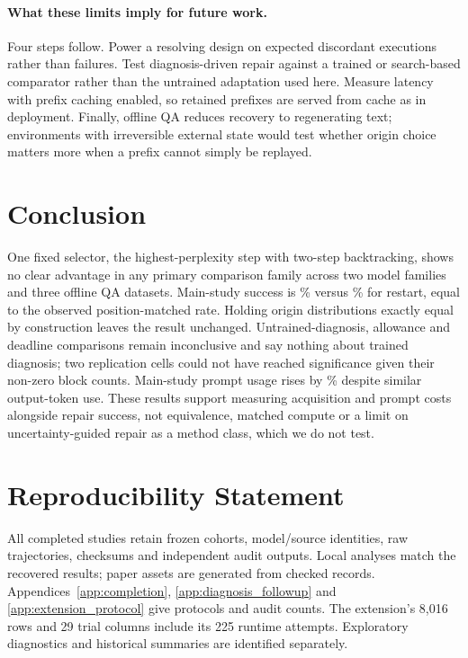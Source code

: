 \documentclass{article}
\begin{document}
\paragraph{What these limits imply for future work.}
Four steps follow. Power a resolving design on expected discordant executions
rather than failures. Test diagnosis-driven repair against a trained or search-based comparator
\citep{rafi2026falat,zhu2026agentdebugx} rather than the untrained adaptation
used here. Measure latency with prefix caching enabled, so retained prefixes
are served from cache as in deployment. Finally, offline QA reduces recovery
to regenerating text; environments with irreversible external state
\citep{zhou2024webarena} would test whether origin choice matters more when a
prefix cannot simply be replayed.

\section{Conclusion}
One fixed selector, the highest-perplexity step with two-step backtracking,
shows no clear advantage in any primary comparison family across two model
families and three offline QA datasets. Main-study success is
\MainTreatmentRate\% versus \MainRestartRate\% for restart, equal to the
observed position-matched rate. Holding origin distributions exactly equal by
construction leaves the result unchanged. Untrained-diagnosis, allowance and
deadline comparisons remain inconclusive and say nothing about trained
diagnosis; two replication cells could not have reached significance given
their non-zero block counts. Main-study prompt usage rises by \ReviewPromptIncrease\% despite
similar output-token use. These results support measuring acquisition and
prompt costs alongside repair success, not equivalence, matched compute or a
limit on uncertainty-guided repair as a method class, which we do not test.

\section*{Reproducibility Statement}
All completed studies retain frozen cohorts, model/source identities, raw
trajectories, checksums and independent audit outputs. Local analyses match
the recovered results; paper assets are generated from checked records.
Appendices~\ref{app:completion}, \ref{app:diagnosis_followup} and
\ref{app:extension_protocol} give protocols and audit counts. The extension's
8,016 rows and 29 trial columns include its 225 runtime attempts. Exploratory
diagnostics and historical summaries are identified separately.
\end{document}
